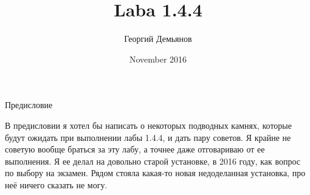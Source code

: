 \documentclass[a4paper,12pt]{article}
\title{Laba 1.4.4}
\author{Георгий Демьянов}
\date{November 2016}
\theoremstyle{plain} %
\theoremstyle{definition} %
\theoremstyle{remark} %
\begin{document}
 

\renewcommand{\figurename}{\textbf{Рис.}}		%
\renewcommand{\tablename}{\textbf{Таблица}}		%

\begin{center}
	{\Large Предисловие}
\end{center}

В предисловии я хотел бы написать о некоторых подводных камнях, которые будут ожидать при выполнении лабы 1.4.4, и дать пару советов. Я крайне не советую вообще браться за эту лабу, а точнее даже отговариваю от ее выполнения. Я ее делал на довольно старой установке, в 2016 году, как вопрос по выбору на экзамен. Рядом стояла какая-то новая недоделанная установка, про неё ничего сказать не могу.
\end{document}
